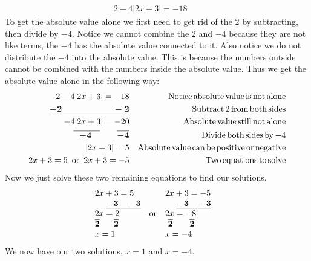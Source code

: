 \begin{example}\label{Lin39}
  \begin{eqnarray*}
    2 - 4 |2x + 3| = - 18 &  & 
  \end{eqnarray*}
  To get the absolute value alone we first need to get rid of the $2$ by
  subtracting, then divide by $- 4$. Notice we cannot combine the $2$ and $-
  4$ because they are not like terms, the $- 4$ has the absolute value
  connected to it. Also notice we do not distribute the $- 4$ into the
  absolute value. This is because the numbers outside cannot be combined with
  the numbers inside the absolute value. Thus we get the absolute value alone
  in the following way:
  \begin{eqnarray*}
    2 - 4 |2x + 3| = - 18 &  & \operatorname{Notice} \operatorname{absolute} \operatorname{value}
    \operatorname{is} \operatorname{not} \operatorname{alone}\\
    \underline{\boldsymbol{- 2 ~~~~~~~~~~~~~~~~~~- 2}} &  & \operatorname{Subtract} 2 \operatorname{from}
    \operatorname{both} \operatorname{sides}\\
    - 4 |2x + 3| = - 20 &  & \operatorname{Absolute} \operatorname{value} \operatorname{still}
    \operatorname{not} \operatorname{alone}\\
    \boldsymbol{\overline{~~- 4~~~} ~~~~~~ \overline{- 4}} &  & \operatorname{Divide} \operatorname{both}
    \operatorname{sides} \operatorname{by} - 4\\
    |2x + 3| = 5 &  & \operatorname{Absolute} \operatorname{value} \operatorname{can} \operatorname{be}
    \operatorname{positive} \operatorname{or} \operatorname{negative}\\
    2 x + 3 = 5 \operatorname{~or~} 2 x + 3 = - 5 &  & \operatorname{Two} \operatorname{equations}
    \operatorname{to} \operatorname{solve}
  \end{eqnarray*}
   Now we just solve these two remaining equations to find our solutions.
  \begin{eqnarray*}
    \begin{array}{l}
      2 x + 3 = 5\\
      ~~~~\boldsymbol{\underline{- 3 ~~- 3}}\\
      2 x = 2\\
      \boldsymbol{ \overline{2} ~~~~~ \overline{2}}\\
      x = 1
    \end{array} \operatorname{~or~} \begin{array}{l}
      2 x + 3 = - 5\\
      ~~~~\boldsymbol{\underline{- 3 ~~- 3}}\\
      2 x = - 8\\
      ~\boldsymbol{ \overline{2} ~~~~~~ \overline{2}}\\
      x = - 4
    \end{array} &  & 
  \end{eqnarray*}
  We now have our two solutions, $x = 1$ and $x = - 4$.
	\end{example}

